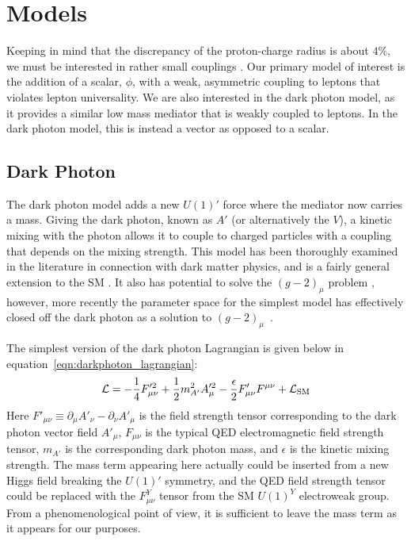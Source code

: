 \section{Models}

Keeping in mind that the discrepancy of the proton-charge radius is about $4\%$, we must be interested in rather small couplings \cite{Carlson:2015jba}.
Our primary model of interest is the addition of a scalar, $\phi$, with a weak, asymmetric coupling to leptons that violates lepton universality.
We are also interested in the dark photon model, as it provides a similar low mass mediator that is weakly coupled to leptons.
In the dark photon model, this is instead a vector as opposed to a scalar.

\subsection{Dark Photon}
The dark photon model adds a new $U(1)'$ force where the mediator now carries a mass.
Giving the dark photon, known as $A'$ (or alternatively the $V$), a kinetic mixing with the photon allows it to couple to charged particles with a coupling that depends on the mixing strength.
This model has been thoroughly examined in the literature in connection with dark matter physics, and is a fairly general extension to the SM \cite{Holdom:1985ag}.
It also has potential to solve the $(g-2)_\mu$ problem \cite{Pospelov:2008zw}, however, more recently the parameter space for the simplest model has effectively closed off the dark photon as a solution to $(g-2)_\mu$~\cite{Batley:2015lha}.

The simplest version of the dark photon Lagrangian is given below in equation~\ref{eqn:darkphoton_lagrangian}:
\begin{equation}
\label{eqn:darkphoton_lagrangian}
\operatorname{\mathcal{L}} = -\frac{1}{4}F'^2_{\mu\nu} + \frac{1}{2}m_{A'}^2 A'^2_\mu - \frac{\epsilon}{2}F'_{\mu\nu} F^{\mu\nu} + \operatorname{\mathcal{L}}_{\textrm{SM}}
\end{equation}
Here $F'_{\mu\nu} \equiv \partial_\mu A'_\nu - \partial_\nu A'_\mu$ is the field strength tensor corresponding to the dark photon vector field $A'_\mu$, $F_{\mu\nu}$ is the typical QED electromagnetic field strength tensor, $m_{A'}$ is the corresponding dark photon mass, and $\epsilon$ is the kinetic mixing strength.
The mass term appearing here actually could be inserted from a new Higgs field breaking the $U(1)'$ symmetry, and the QED field strength tensor could be replaced with the $F^Y_{\mu\nu}$ tensor from the SM $U(1)^Y$ electroweak group.
From a phenomenological point of view, it is sufficient to leave the mass term as it appears for our purposes.

